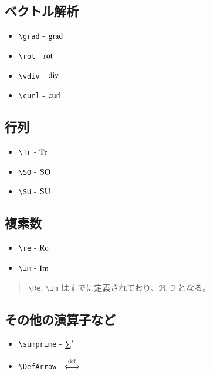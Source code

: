 \documentclass[oneside,10pt,a4paper]{jsarticle}
\begin{document}
  \subsection{ベクトル解析}

  \begin{itemize}
    \item \verb|\grad| - $ \operatorname{grad} $
    \item \verb|\rot| - $ \operatorname{rot} $
    \item \verb|\vdiv| - $ \operatorname{div} $
    \item \verb|\curl| - $ \operatorname{curl} $
  \end{itemize}

  \subsection{行列}

  \begin{itemize}
    \item \verb|\Tr| - $ \operatorname{Tr} $
    \item \verb|\SO| - $ \operatorname{SO} $
    \item \verb|\SU| - $ \operatorname{SU} $
  \end{itemize}

  \subsection{複素数}

  \begin{itemize}
    \item \verb|\re| - $ \operatorname{Re} $
    \item \verb|\im| - $ \operatorname{Im} $
  \end{itemize}

  \Remark
  \begin{quote}
    \verb|\Re|, \verb|\Im| はすでに定義されており、$ \Re $, $ \Im $ となる。
  \end{quote}

  \subsection{その他の演算子など}

  \begin{itemize}
    \item \verb|\sumprime| - $ \operatorname*{{\sum}^{\prime}} $
    \item \verb|\DefArrow| - $ \operatorname{{\stackrel{\mathrm{def}}{\Longleftrightarrow}}} $
  \end{itemize}
\end{document}
